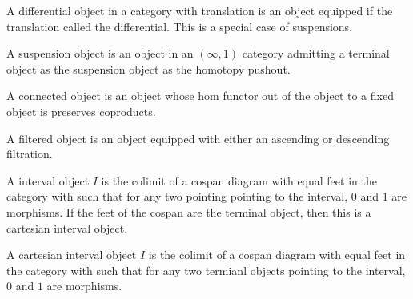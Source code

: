 \begin{definition}
    \label{definition-differential-object}
    A differential object in a category with translation is an object equipped if the translation called the differential. This is a special case of suspensions.
\end{definition}

\begin{definition}
    \label{definition-suspension-object}
    A suspension object is an object in an $(\infty,1)$ category admitting a terminal object as the suspension object as the homotopy pushout.
\end{definition}

\begin{definition}
    \label{definition-connected-object}
    A connected object is an object whose hom functor out of the object to a fixed object is preserves coproducts.
\end{definition}

\begin{definition}
    \label{definition-filtered-object}
    A filtered object is an object equipped with either an ascending or descending filtration.
\end{definition}

\begin{definition}
    \label{definition-interval-object}
    A interval object $I$ is the colimit of a cospan diagram with equal feet in the category with such that for any
    two pointing pointing to the interval, $0$ and $1$ are morphisms. If the feet of the cospan are the terminal object, then this is a cartesian interval object.
\end{definition}

\begin{definition}
    \label{definition-cartesian-interval-object}
    A cartesian interval object $I$ is the colimit of a cospan diagram with equal feet in the category with such that for any two termianl objects pointing to the interval, $0$ and $1$ are morphisms.
\end{definition}

